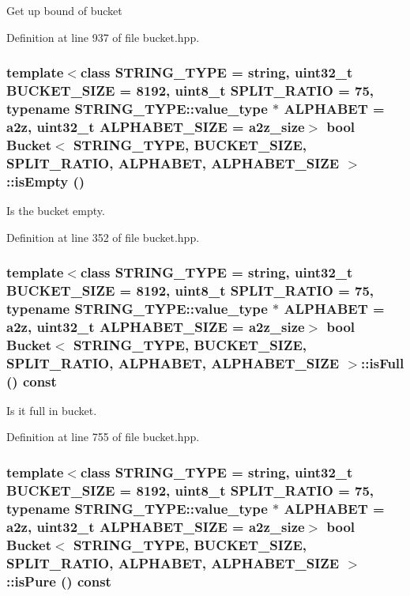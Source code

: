 Get up bound of bucket 

Definition at line 937 of file bucket.hpp.\hypertarget{classBucket_ed3a301fdef6969da839b34bda7b6abe}{
\subsubsection[{isEmpty}]{\setlength{\rightskip}{0pt plus 5cm}template$<$class STRING\_\-TYPE  = string, uint32\_\-t BUCKET\_\-SIZE = 8192, uint8\_\-t SPLIT\_\-RATIO = 75, typename STRING\_\-TYPE::value\_\-type $\ast$ ALPHABET = a2z, uint32\_\-t ALPHABET\_\-SIZE = a2z\_\-size$>$ bool {\bf Bucket}$<$ STRING\_\-TYPE, BUCKET\_\-SIZE, SPLIT\_\-RATIO, ALPHABET, ALPHABET\_\-SIZE $>$::isEmpty ()}}
\label{classBucket_ed3a301fdef6969da839b34bda7b6abe}


Is the bucket empty. 

Definition at line 352 of file bucket.hpp.\hypertarget{classBucket_9f4c866f5d4b0d165491a2c563831350}{
\subsubsection[{isFull}]{\setlength{\rightskip}{0pt plus 5cm}template$<$class STRING\_\-TYPE  = string, uint32\_\-t BUCKET\_\-SIZE = 8192, uint8\_\-t SPLIT\_\-RATIO = 75, typename STRING\_\-TYPE::value\_\-type $\ast$ ALPHABET = a2z, uint32\_\-t ALPHABET\_\-SIZE = a2z\_\-size$>$ bool {\bf Bucket}$<$ STRING\_\-TYPE, BUCKET\_\-SIZE, SPLIT\_\-RATIO, ALPHABET, ALPHABET\_\-SIZE $>$::isFull () const}}
\label{classBucket_9f4c866f5d4b0d165491a2c563831350}


Is it full in bucket. 

Definition at line 755 of file bucket.hpp.\hypertarget{classBucket_f155c7047ad233e70dd96126ef6dad03}{
\subsubsection[{isPure}]{\setlength{\rightskip}{0pt plus 5cm}template$<$class STRING\_\-TYPE  = string, uint32\_\-t BUCKET\_\-SIZE = 8192, uint8\_\-t SPLIT\_\-RATIO = 75, typename STRING\_\-TYPE::value\_\-type $\ast$ ALPHABET = a2z, uint32\_\-t ALPHABET\_\-SIZE = a2z\_\-size$>$ bool {\bf Bucket}$<$ STRING\_\-TYPE, BUCKET\_\-SIZE, SPLIT\_\-RATIO, ALPHABET, ALPHABET\_\-SIZE $>$::isPure () const}}
\label{classBucket_f155c7047ad233e70dd96126ef6dad03}


